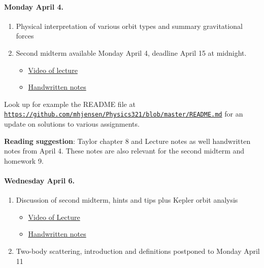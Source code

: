 \documentclass[%
oneside,                 %
final,                   %
10pt]{article}
\begin{document}
\paragraph{Monday April 4.}
\begin{enumerate}
\item Physical interpretation of various orbit types and summary gravitational forces

\item Second midterm available Monday April 4, deadline April 15 at midnight.
\begin{itemize}

  \item \href{{https://youtu.be/Kk6cfqhxxRo}}{Video of lecture}

  \item \href{{https://github.com/mhjensen/Physics321/blob/master/doc/HandWrittenNotes/Spring2022/NotesApril4.pdf}}{Handwritten notes}
\end{itemize}

\noindent
\end{enumerate}

\noindent
Look up for example the README file at \href{{https://github.com/mhjensen/Physics321/blob/master/README.md}}{\nolinkurl{https://github.com/mhjensen/Physics321/blob/master/README.md}} for an update on solutions to various assignments.

\textbf{Reading suggestion}: Taylor chapter 8 and Lecture notes as well handwritten notes from April 4. These notes are also relevant for the second midterm and homework 9.

\paragraph{Wednesday April 6.}
\begin{enumerate}
\item Discussion of second midterm, hints and tips plus Kepler orbit analysis
\begin{itemize}

  \item \href{{https://youtu.be/4l6nLXgF6Hw}}{Video of Lecture}

  \item \href{{https://github.com/mhjensen/Physics321/blob/master/doc/HandWrittenNotes/Spring2022/NotesApril6.pdf}}{Handwritten notes}  

\end{itemize}

\noindent
\item Two-body scattering, introduction and definitions postponed to Monday April 11
\end{enumerate}
\end{document}

